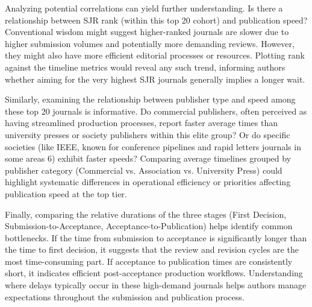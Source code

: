\documentclass[../main.tex]{subfiles}
\begin{document}
\vspace{0.4cm}
\noindent
Analyzing potential correlations can yield further understanding. Is there a relationship between SJR rank (within this top 20 cohort) and publication speed? Conventional wisdom might suggest higher-ranked journals are slower due to higher submission volumes and potentially more demanding reviews. However, they might also have more efficient editorial processes or resources. Plotting rank against the timeline metrics would reveal any such trend, informing authors whether aiming for the very highest SJR journals generally implies a longer wait.

\vspace{0.4cm}
\noindent
Similarly, examining the relationship between publisher type and speed among these top 20 journals is informative. Do commercial publishers, often perceived as having streamlined production processes, report faster average times than university presses or society publishers within this elite group? Or do specific societies (like IEEE, known for conference pipelines and rapid letters journals in some areas 6) exhibit faster speeds? Comparing average timelines grouped by publisher category (Commercial vs. Association vs. University Press) could highlight systematic differences in operational efficiency or priorities affecting publication speed at the top tier.

\vspace{0.4cm}
\noindent
Finally, comparing the relative durations of the three stages (First Decision, Submission-to-Acceptance, Acceptance-to-Publication) helps identify common bottlenecks. If the time from submission to acceptance is significantly longer than the time to first decision, it suggests that the review and revision cycles are the most time-consuming part. If acceptance to publication times are consistently short, it indicates efficient post-acceptance production workflows. Understanding where delays typically occur in these high-demand journals helps authors manage expectations throughout the submission and publication process.
\end{document}
